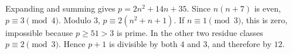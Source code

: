 Expanding and summing gives $p=2n^2+14n+35$. Since $n(n+7)$ is even, $p\equiv3\pmod4$. Modulo $3$, $p\equiv2(n^2+n+1)$. If $n\equiv1\pmod3$, this is zero, impossible because $p\ge51>3$ is prime. In the other two residue classes $p\equiv2\pmod3$. Hence $p+1$ is divisible by both $4$ and $3$, and therefore by $12$.
